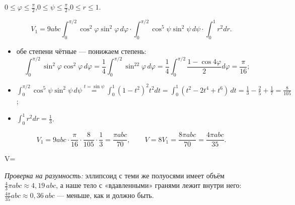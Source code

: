 $0\leqslant\varphi\leqslant\frac\pi2$,\quad $0\leqslant\psi\leqslant\frac\pi2$,\quad $0\leqslant r\leqslant1$.

\[
V_1=9abc\int_0^{\pi/2}\cos^2\varphi\sin^2\varphi\,d\varphi\cdot\int_0^{\pi/2}\cos^5\psi\sin^2\psi\,d\psi\cdot\int_0^1r^2dr .
\]
\begin{itemize}
\item обе степени чётные --- понижаем степень:
\[\int_0^{\pi/2}\sin^2\varphi\cos^2\varphi\,d\varphi=\frac14\int_0^{\pi/2}\sin^22\varphi\,d\varphi=\frac14\int_0^{\pi/2}\frac{1-\cos4\varphi}{2}d\varphi=\frac{\pi}{16};\]
\item $\displaystyle\int_0^{\pi/2}\cos^5\psi\sin^2\psi\,d\psi\overset{t=\sin\psi}{=}\int_0^1(1-t^2)^2t^2dt=\int_0^1(t^2-2t^4+t^6)\,dt=\frac13-\frac25+\frac17=\frac{8}{105}$;
\item $\displaystyle\int_0^1r^2dr=\frac13$.
\end{itemize}
\[
V_1=9abc\cdot\frac{\pi}{16}\cdot\frac{8}{105}\cdot\frac13=\frac{\pi abc}{70},\qquad V=8V_1=\frac{8\pi abc}{70}=\frac{4\pi abc}{35}.
\]

\begin{answerbox}
V=
\end{answerbox}

\emph{Проверка на разумность:} эллипсоид с теми же полуосями имеет объём $\frac43\pi abc\approx4{,}19\,abc$, а наше тело с «вдавленными» гранями лежит внутри него: $\frac{4\pi}{35}abc\approx0{,}36\,abc$ --- меньше, как и должно быть. \checkmark

\clearpage
